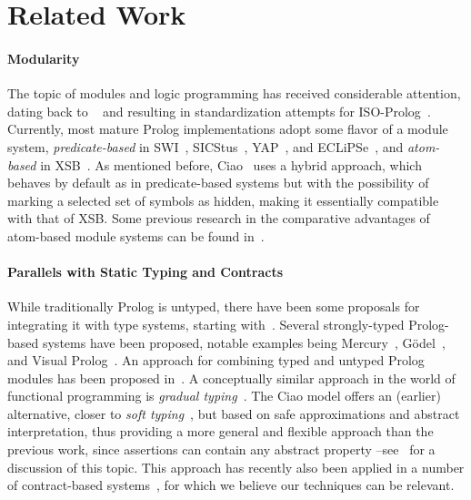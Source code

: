 \documentclass{llncs}
\begin{document}

\section{Related Work}

\paragraph{Modularity}%
%
The topic of modules and logic programming has received considerable
attention,
dating back to%
~\cite{WarrenChen87-short,Chen87-short,Miller89} and resulting in
standardization attempts for ISO-Prolog~\cite{standard-modules-final-short}.
%
Currently, most mature Prolog implementations adopt some flavor of a
module system, \emph{predicate-based} in
SWI~\cite{swi-journal-2012-short},
SICStus~\cite{sicstus-journal-2012-short},
YAP~\cite{yap-journal-2012-short}, and
ECLiPSe~\cite{eclipse-journal-2012-short}, and
\emph{atom-based} in XSB~\cite{xsb-journal-2012}.
%
As mentioned before,
Ciao~\cite{hermenegildo11:ciao-design-tplp-shorter,ciao-modules-cl2000-short}
uses a hybrid approach, which behaves by default as in predicate-based
systems but
with the possibility of marking a selected set of symbols as hidden,
making it essentially compatible with that of XSB.
%
Some previous research in the comparative advantages of atom-based
module systems can be found in~\cite{DBLP:conf/iclp/HaemmerleF06-short}.


\paragraph{Parallels with Static Typing and Contracts}%
%
While traditionally Prolog is untyped, there have been some proposals
for integrating it with type systems, starting
with~\cite{mycr84}.
%
Several strongly-typed Prolog-based systems have been proposed, notable
examples being Mercury~\cite{mercury-jlp}, G{\"o}del~\cite{goedel-short},
and Visual Prolog~\cite{visual-prolog-short}.
%
An approach for combining typed and untyped Prolog modules has been
proposed in~\cite{schrijvers08:typed_prolog-short}.
%
A conceptually similar approach in the world of functional programming
is
\emph{gradual
  typing}~\cite{Siek06gradualtyping,%
DBLP:conf/popl/TakikawaFGNVF16-short}.
%
The Ciao model offers an (earlier) alternative, closer to \emph{soft
  typing}~\cite{cartwright91:soft_typing-short}, but based on safe
approximations and abstract
interpretation, thus providing a
more general and flexible approach
than
the previous work, since assertions can contain any abstract property
--see~\cite{hermenegildo11:ciao-stop-short} for a discussion of this
topic.
%
This approach has recently also been applied in a number of contract-based
systems~\cite{clousot-2010-short,DBLP:conf/oopsla/Tobin-HochstadtH12-short,DBLP:conf/pldi/NguyenH15-short},
for which we believe our techniques
can be relevant.
\end{document}

